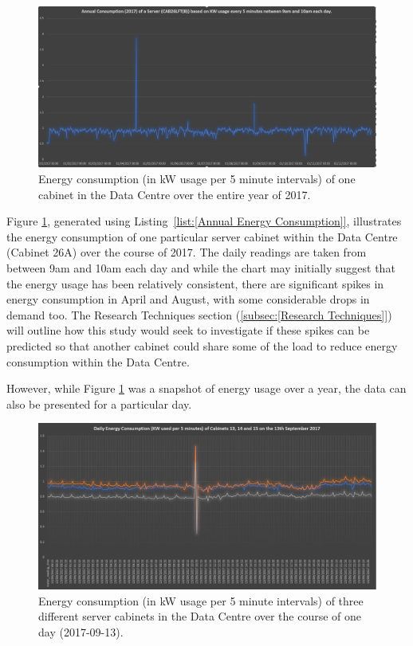 \documentclass[12pt]{scrartcl}
\begin{document}
\begin{figure}[h]
  \caption{Energy consumption (in kW usage per 5 minute intervals) of one cabinet in the Data Centre over the entire year of 2017.}
  \label{fig:Annualenergyfigure}
  \centering
    \includegraphics[scale=0.30]{Annual_energy_consumption.png}
\end{figure}

Figure \ref{fig:Annualenergyfigure}, generated using Listing~\ref{list:[Annual Energy Consumption]}, illustrates the energy consumption of one particular server cabinet within the Data Centre (Cabinet 26A) over the course of 2017. The daily readings are taken from between 9am and 10am each day and while the chart may initially suggest that the energy usage has been relatively consistent, there are significant spikes in energy consumption in April and August, with some considerable drops in demand too. The Research Techniques section (\ref{subsec:[Research Techniques]}) will outline how this study would seek to investigate if these spikes can be predicted so that another cabinet could share some of the load to reduce energy consumption within the Data Centre.

However, while Figure \ref{fig:Annualenergyfigure} was a snapshot of energy usage over a year, the data can also be presented for a particular day. 

\begin{figure}[h]
  \caption{Energy consumption (in kW usage per 5 minute intervals) of three different server cabinets in the Data Centre over the course of one day (2017-09-13).}
  \label{fig:Dailyenergyfigure}
  \centering
    \includegraphics[scale=0.35]{Daily_energy_consumption_of_cab131415.png}
\end{figure}
   
\end{document}
